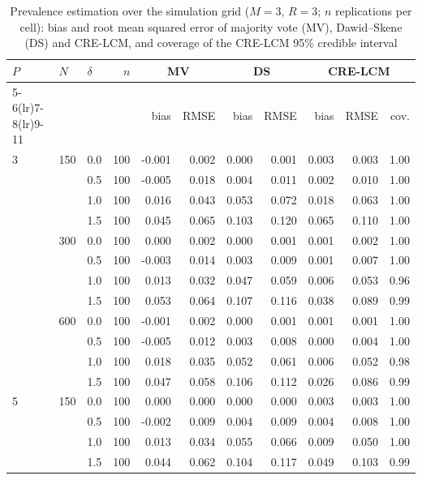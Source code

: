 \begin{table}[htbp]
\centering
\scriptsize
\setlength{\tabcolsep}{4pt}
\caption{Prevalence estimation over the simulation grid ($M = 3$, $R = 3$; $n$ replications per cell): bias and root mean squared error of majority vote (MV), Dawid--Skene (DS) and CRE-LCM, and coverage of the CRE-LCM 95\% credible interval}\label{tab:prev}
\begin{tabular}{lllrrrrrrrr}
\toprule
$P$ & $N$ & $\delta$ & $n$ & \multicolumn{2}{c}{MV} & \multicolumn{2}{c}{DS} & \multicolumn{3}{c}{CRE-LCM} \\
\cmidrule(lr){5-6}\cmidrule(lr){7-8}\cmidrule(lr){9-11}
 & & & & bias & RMSE & bias & RMSE & bias & RMSE & cov. \\
\midrule
3 & 150 & 0.0 & 100 & -0.001 & 0.002 & 0.000 & 0.001 & 0.003 & 0.003 & 1.00 \\
 &  & 0.5 & 100 & -0.005 & 0.018 & 0.004 & 0.011 & 0.002 & 0.010 & 1.00 \\
 &  & 1.0 & 100 & 0.016 & 0.043 & 0.053 & 0.072 & 0.018 & 0.063 & 1.00 \\
 &  & 1.5 & 100 & 0.045 & 0.065 & 0.103 & 0.120 & 0.065 & 0.110 & 1.00 \\
 & 300 & 0.0 & 100 & 0.000 & 0.002 & 0.000 & 0.001 & 0.001 & 0.002 & 1.00 \\
 &  & 0.5 & 100 & -0.003 & 0.014 & 0.003 & 0.009 & 0.001 & 0.007 & 1.00 \\
 &  & 1.0 & 100 & 0.013 & 0.032 & 0.047 & 0.059 & 0.006 & 0.053 & 0.96 \\
 &  & 1.5 & 100 & 0.053 & 0.064 & 0.107 & 0.116 & 0.038 & 0.089 & 0.99 \\
 & 600 & 0.0 & 100 & -0.001 & 0.002 & 0.000 & 0.001 & 0.001 & 0.001 & 1.00 \\
 &  & 0.5 & 100 & -0.005 & 0.012 & 0.003 & 0.008 & 0.000 & 0.004 & 1.00 \\
 &  & 1.0 & 100 & 0.018 & 0.035 & 0.052 & 0.061 & 0.006 & 0.052 & 0.98 \\
 &  & 1.5 & 100 & 0.047 & 0.058 & 0.106 & 0.112 & 0.026 & 0.086 & 0.99 \\
5 & 150 & 0.0 & 100 & 0.000 & 0.000 & 0.000 & 0.000 & 0.003 & 0.003 & 1.00 \\
 &  & 0.5 & 100 & -0.002 & 0.009 & 0.004 & 0.009 & 0.004 & 0.008 & 1.00 \\
 &  & 1.0 & 100 & 0.013 & 0.034 & 0.055 & 0.066 & 0.009 & 0.050 & 1.00 \\
 &  & 1.5 & 100 & 0.044 & 0.062 & 0.104 & 0.117 & 0.049 & 0.103 & 0.99 \\

\end{tabular}
\end{table}
